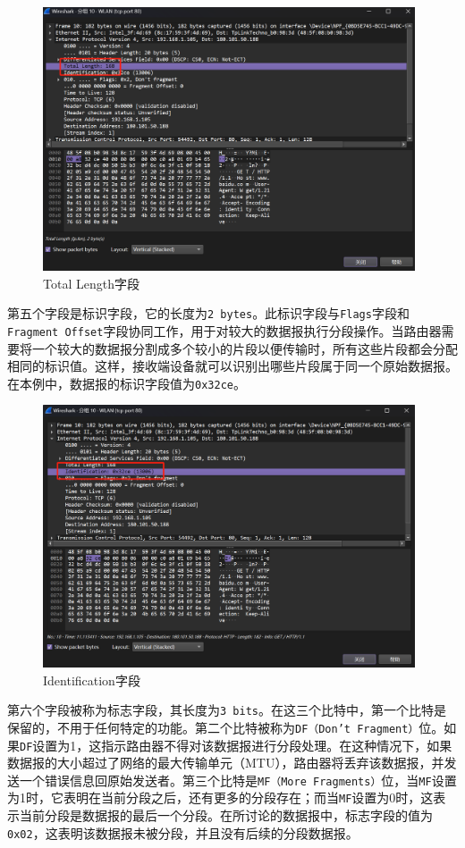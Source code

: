 \documentclass{article}
\begin{document}
	\begin{figure}[H]
		\centering
		\includegraphics[width=11cm]{images/10. Total Length字段.jpg}
		\caption{Total Length字段}
	\end{figure}
	
	第五个字段是标识字段，它的长度为\texttt{2 bytes}。此标识字段与\texttt{Flags}字段和\texttt{Fragment Offset}字段协同工作，用于对较大的数据报执行分段操作。当路由器需要将一个较大的数据报分割成多个较小的片段以便传输时，所有这些片段都会分配相同的标识值。这样，接收端设备就可以识别出哪些片段属于同一个原始数据报。在本例中，数据报的标识字段值为\texttt{0x32ce}。
	
	\begin{figure}[H]
		\centering
		\includegraphics[width=11cm]{images/11. Identification字段.jpg}
		\caption{Identification字段}
	\end{figure}
	
	第六个字段被称为标志字段，其长度为\texttt{3 bits}。在这三个比特中，第一个比特是保留的，不用于任何特定的功能。第二个比特被称为\texttt{DF（Don't Fragment）}位。如果\texttt{DF}设置为1，这指示路由器不得对该数据报进行分段处理。在这种情况下，如果数据报的大小超过了网络的最大传输单元（MTU），路由器将丢弃该数据报，并发送一个错误信息回原始发送者。第三个比特是\texttt{MF（More Fragments）}位，当\texttt{MF}设置为1时，它表明在当前分段之后，还有更多的分段存在；而当\texttt{MF}设置为0时，这表示当前分段是数据报的最后一个分段。在所讨论的数据报中，标志字段的值为\texttt{0x02}，这表明该数据报未被分段，并且没有后续的分段数据报。
	
\end{document}
